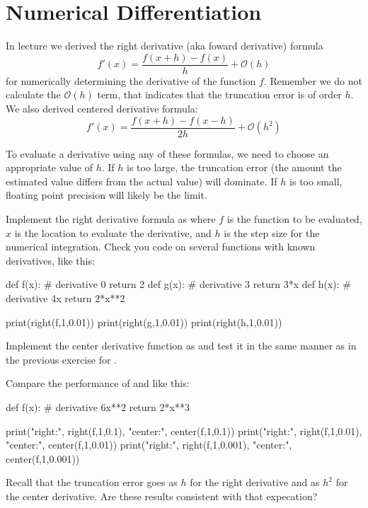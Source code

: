 \section{Numerical Differentiation}

In lecture we derived the right derivative (aka foward derivative) formula
\begin{displaymath}
  f'(x) = \frac{f(x+h) - f(x)}{h} + \mathcal{O}(h)
\end{displaymath}
for numerically determining the derivative of the function $f$.  Remember we do not calculate the 
$\mathcal{O}(h)$ term, that indicates that the truncation error is of order $h$.
We also derived centered derivative formula:
\begin{displaymath}
f'(x) = \frac{f(x+h) - f(x-h)}{2h} + \mathcal{O}(h^2)
\end{displaymath}

To evaluate a derivative using any of these formulas, we need to
choose an appropriate value of $h$.  If $h$ is too large, the
truncation error (the amount the estimated value differs from the
actual value) will dominate.  If $h$ is too small, floating point
precision will likely be the limit.

\plot Implement the right derivative formula as 
where $f$ is the function to be evaluated, $x$ is the location to
evaluate the derivative, and $h$ is the step size for the numerical
integration.  Check you code on several functions with known
derivatives, like this:
\begin{python}
def f(x):  # derivative 0
    return 2
def g(x):  # derivative 3
    return 3*x
def h(x):  # derivative 4x
    return 2*x**2

print(right(f,1,0.01))
print(right(g,1,0.01))
print(right(h,1,0.01))
\end{python}


\plot Implement the center derivative function as  and test it in the same manner as in the previous exercise for .


\plot Compare the performance of  and  like this:
\begin{python}
def f(x):  # derivative 6x**2
    return 2*x**3

print("right:", right(f,1,0.1),   "center:", center(f,1,0.1))
print("right:", right(f,1,0.01),  "center:", center(f,1,0.01)) 
print("right:", right(f,1,0.001), "center:", center(f,1,0.001)) 
\end{python}
Recall that the truncation error goes as $h$ for the right derivative and as $h^2$ for the center derivative.  Are these results consistent with that expecation?



